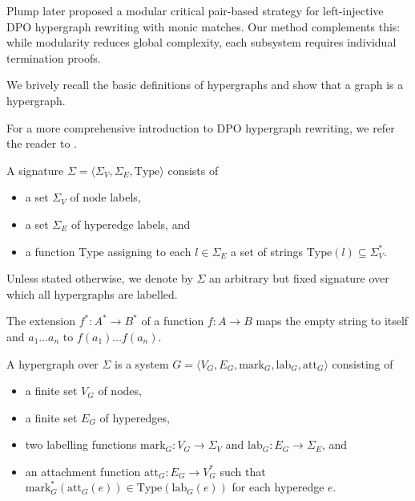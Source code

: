 Plump \cite{plump2018modular} later proposed a modular critical pair-based strategy for left-injective DPO hypergraph rewriting with monic matches. 
Our method complements this: while modularity reduces global complexity, each subsystem requires individual termination proofs. 

We brively recall the basic definitions of hypergraphs and show that a graph is a hypergraph.

 For a more comprehensive introduction to DPO hypergraph rewriting, we refer the reader to \cite{plump2018modular}. 

\begin{definition}
    A signature $\Sigma = \langle \Sigma_V, \Sigma_E, \text{Type} \rangle$ consists of 
    \begin{itemize}
        \item a set $\Sigma_V$ of node labels,
        \item a set $\Sigma_E$ of hyperedge labels, and
        \item a function $\text{Type}$ assigning to each $l \in \Sigma_E$ a set of strings $\text{Type}(l) \subseteq \Sigma_V^*$.
    \end{itemize}
\end{definition}
Unless stated otherwise, we denote by $\Sigma$ an arbitrary but fixed signature over which all hypergraphs are labelled.

\begin{remark}
    The extension $f^* : A^* \to B^*$ of a function $f : A \to B$ maps the empty string to itself and $a_1 \ldots a_n$ to $f(a_1) \ldots f(a_n)$.
\end{remark}
\begin{definition}
    A hypergraph over $\Sigma$ is a system $G = \langle V_G, E_G, \text{mark}_G, \text{lab}_G, \text{att}_G \rangle$ consisting of 
    \begin{itemize}
        \item a finite set $V_G$ of nodes,
        \item a finite set $E_G$ of hyperedges,
        \item two labelling functions $\text{mark}_G : V_G \to \Sigma_V$ and $\text{lab}_G : E_G \to \Sigma_E$, and
        \item an attachment function $\text{att}_G : E_G \to V_G^*$ such that $\text{mark}_G^*(\text{att}_G(e)) \in \text{Type}(\text{lab}_G(e))$ for each hyperedge $e$.
    \end{itemize} 
\end{definition} 

